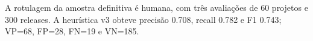 A rotulagem da amostra definitiva é humana, com três avaliações de 60 projetos e 300 releases. A heurística v3 obteve precisão 0.708, recall 0.782 e F1 0.743; VP=68, FP=28, FN=19 e VN=185.

